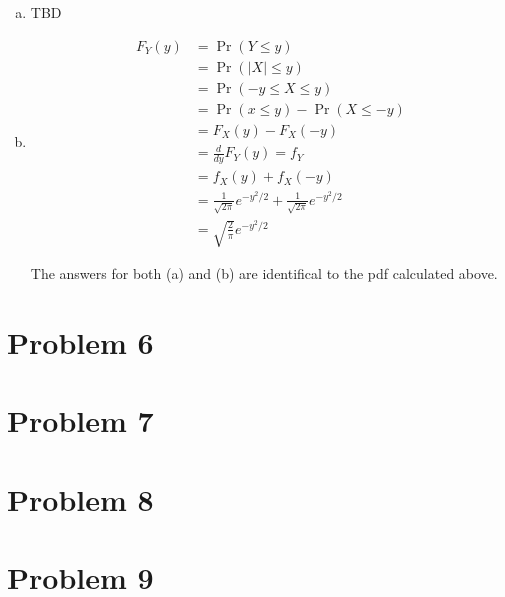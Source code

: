 \documentclass[11pt]{article}
\begin{document}
\begin{enumerate}[(a)]
    \item TBD

    \item 
      \begin{align*}
        F_Y(y) &= \Pr(Y \le y) \\
        &= \Pr(|X| \le y) \\
        &= \Pr(-y \le X \le y) \\
        &= \Pr(x \le y) - \Pr(X \le -y) \\
        &= F_X(y) - F_X(-y) \\
        &= \frac{d}{dy} F_Y(y) = f_Y \\
        &= f_X(y) + f_X(-y) \\
        &= \frac{1}{\sqrt{2 \pi}} e^{-y^2/2} + \frac{1}{\sqrt{2 \pi}} e^{-y^2/2} \\
        &= \sqrt{\frac{2}{\pi}} e^{-y^2/2}
      \end{align*}

      The answers for both (a) and (b) are identifical to the pdf calculated above.

\end{enumerate}

\section*{Problem 6}



\section*{Problem 7}


\section*{Problem 8}


\section*{Problem 9}
\end{document}
